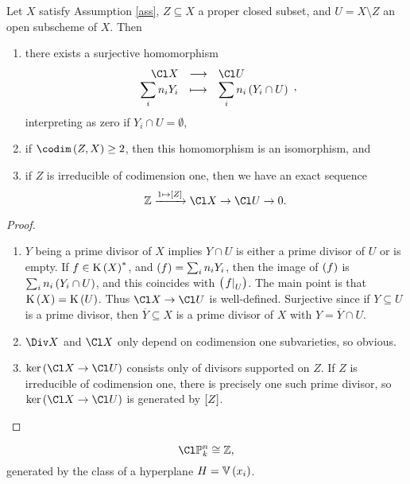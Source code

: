 
\begin{proposition}
Let $ X $ satisfy Assumption \ref{ass}, $ Z \subseteq X $ a proper closed subset, and $ U = X \setminus Z $ an open subscheme of $ X $. Then
\begin{enumerate}
\item there exists a surjective homomorphism
$$ \function{\Cl X}{\Cl U}{\sum_i n_iY_i}{\sum_i n_i\br{Y_i \cap U}}, $$
interpreting as zero if $ Y_i \cap U = \emptyset $,
\item if $ \codim\br{Z, X} \ge 2 $, then this homomorphism is an isomorphism, and
\item if $ Z $ is irreducible of codimension one, then we have an exact sequence
$$ \ZZ \xrightarrow{1 \mapsto \sbr{Z}} \Cl X \to \Cl U \to 0. $$
\end{enumerate}
\end{proposition}

\pagebreak

\begin{proof}
\hfill
\begin{enumerate}
\item $ Y $ being a prime divisor of $ X $ implies $ Y \cap U $ is either a prime divisor of $ U $ or is empty. If $ f \in \K\br{X}^* $, and $ \br{f} = \sum_i n_iY_i $, then the image of $ \br{f} $ is $ \sum_i n_i\br{Y_i \cap U} $, and this coincides with $ \br{\eval{f}_U} $. The main point is that $ \K\br{X} = \K\br{U} $. Thus $ \Cl X \to \Cl U $ is well-defined. Surjective since if $ Y \subseteq U $ is a prime divisor, then $ \overline{Y} \subseteq X $ is a prime divisor of $ X $ with $ Y = \overline{Y} \cap U $.
\item $ \Div X $ and $ \Cl X $ only depend on codimension one subvarieties, so obvious.
\item $ \ker \br{\Cl X \to \Cl U} $ consists only of divisors supported on $ Z $. If $ Z $ is irreducible of codimension one, there is precisely one such prime divisor, so $ \ker \br{\Cl X \to \Cl U} $ is generated by $ \sbr{Z} $.
\end{enumerate}
\end{proof}

\begin{proposition}
$$ \Cl \PP_k^n \cong \ZZ, $$
generated by the class of a hyperplane $ H = \VV\br{x_i} $.
\end{proposition}

